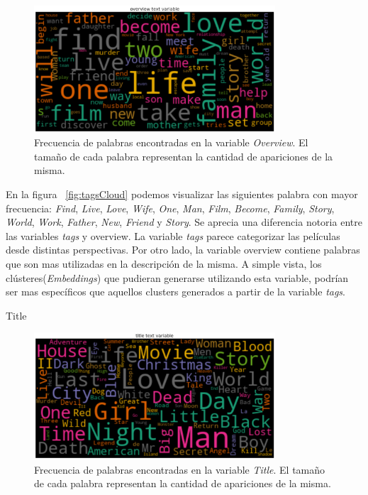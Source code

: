 \documentclass[11pt,a4paper,twoside]{thesis}
\begin{document}
\begin{figure}[h!]
	\centering
	\includegraphics[width=9cm]{./images/Cloud-Overview.png}
	\caption{Frecuencia de palabras encontradas en la variable \textit{Overview}. El tamaño de cada palabra representan la cantidad de apariciones de la misma.}
	\label{fig:overviewCloud}
\end{figure}

En la figura ~\ref{fig:tagsCloud} podemos visualizar las siguientes palabra con
mayor frecuencia: \textit{Find}, \textit{Live}, \textit{Love}, \textit{Wife},
\textit{One}, \textit{Man}, \textit{Film}, \textit{Become}, \textit{Family},
\textit{Story}, \textit{World}, \textit{Work}, \textit{Father}, \textit{New},
\textit{Friend} y \textit{Story}. Se aprecia una diferencia notoria entre las
variables \textit{tags} y overview. La variable \textit{tags} parece
categorizar las películas desde distintas perspectivas. Por otro lado, la
variable overview contiene palabras que son mas utilizadas en la descripción de
la misma. A simple vista, los clústeres(\textit{Embeddings}) que pudieran
generarse utilizando esta variable, podrían ser mas específicos que aquellos
clusters generados a partir de la variable \textit{tags}.

\begin{description}
	\item[Title]
\end{description}

\begin{figure}[h!]
	\centering
	\includegraphics[width=9cm]{./images/Cloud-Title.png}
	\caption{Frecuencia de palabras encontradas en la variable \textit{Title}. El tamaño de cada palabra representan la cantidad de apariciones de la misma.}
	\label{fig:titleCloud}
\end{figure}
\end{document}

